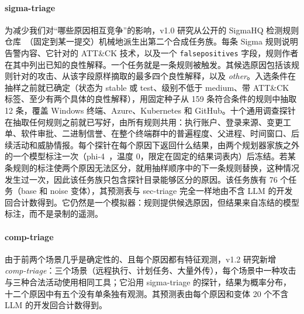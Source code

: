 \paragraph{sigma-triage} 为减少我们对“哪些原因相互竞争”的影响，v1.0 研究从公开的 SigmaHQ 检测规则仓库~\citep{sigmahq}（固定到某一提交）机械地派生出第二个合成任务族。每条 Sigma 规则说明告警内容、它针对的 ATT\&CK 技术，以及一个 \texttt{falsepositives} 字段，规则作者在其中列出已知的良性解释。一个任务就是一条规则被触发。其候选原因包括该规则针对的攻击、从该字段原样摘取的最多四个良性解释，以及 \textit{other}。入选条件在抽样之前就已确定（状态为 stable 或 test、级别不低于 medium、带 ATT\&CK 标签、至少有两个具体的良性解释），用固定种子从 159 条符合条件的规则中抽取 12 条，覆盖 Windows 终端、Azure、Kubernetes 和 GitHub。十个通用调查探针在抽取任何规则之前就已写好，由所有规则共用：执行账户、登录来源、变更工单、软件审批、二进制信誉、在整个终端群中的普遍程度、父进程、时间窗口、后续活动和威胁情报。每个探针在每个原因下返回什么结果，由两个规划器家族之外的一个模型标注一次（phi-4~\citep{phi4}，温度 0，限定在固定的结果词表内）后冻结。若某条规则的标注使两个原因无法区分，就用抽样顺序中的下一条规则替换，这种情况发生过一次，因此该任务族只包含探针目录能够区分的原因。该任务族有 76 个任务（base 和 noise 变体），其预测表与 sec-triage 完全一样地由不含 LLM 的开发回合计数得到。它仍然是一个模拟器：规则提供候选原因，但结果来自冻结的模型标注，而不是录制的遥测。

\paragraph{comp-triage} 由于前两个场景几乎是确定性的、且每个原因都有特征观测，v1.2 研究新增 \emph{comp-triage}：三个场景（远程执行、计划任务、大量外传），每个场景中一种攻击与三种合法活动使用相同工具；它沿用 sigma-triage 的探针，结果为概率分布，十二个原因中有五个没有单条独有观测。其预测表由每个原因和变体 20 个不含 LLM 的开发回合计数得到。

